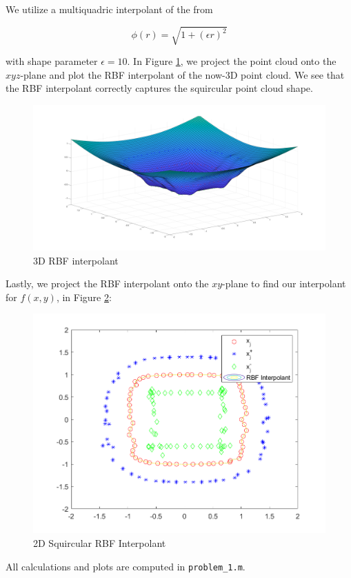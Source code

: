 \begin{solution}
  \pagebreak
  We utilize a multiquadric interpolant of the from

  $$
  \phi(r) = \sqrt{1 + (\epsilon r)^2}
  $$

  with shape parameter $\epsilon = 10$. In Figure \ref{fig:problem_1ii}, we project the point cloud onto the $xyz$-plane 
  and plot the RBF interpolant  of the now-3D point cloud. We see that the RBF interpolant correctly captures the squircular point cloud shape.

  \begin{figure}[h]
    \centering
    \includegraphics*[width=\textwidth]{problem_1ii.png}
    \caption{3D RBF interpolant}
    \label{fig:problem_1ii}
  \end{figure}

  \pagebreak
  Lastly, we project the RBF interpolant onto the $xy$-plane to find our interpolant for $f(x, y)$, in Figure 
  \ref{fig:problem_1iii}:

  \begin{figure}[h]
    \centering
    \includegraphics*[width=\textwidth]{problem_1iii.png}
    \caption{2D Squircular RBF Interpolant}
    \label{fig:problem_1iii}
  \end{figure}

  All calculations and plots are computed in \texttt{problem\_1.m}.
\end{solution}
